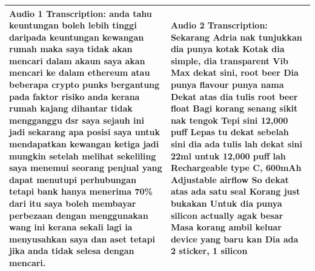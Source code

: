 \documentclass[preprint]{article}
\begin{document}
\begin{table}[hbt!]
\begin{tabular}{p{6.5cm} p{6.5cm}}
    Audio 1 Transcription: anda tahu keuntungan boleh lebih tinggi daripada keuntungan kewangan rumah maka saya tidak akan mencari dalam akaun saya akan mencari ke dalam ethereum atau beberapa crypto punks bergantung pada faktor risiko anda kerana rumah kajang dihantar tidak mengganggu dsr saya sejauh ini jadi sekarang apa posisi saya untuk mendapatkan kewangan ketiga jadi mungkin setelah melihat sekeliling saya menemui seorang penjual yang dapat menutupi perhubungan tetapi bank hanya menerima 70\% dari itu saya boleh membayar perbezaan dengan menggunakan wang ini kerana sekali lagi ia menyusahkan saya dan aset tetapi jika anda tidak selesa dengan mencari. & Audio 2 Transcription: Sekarang Adria nak tunjukkan dia punya kotak Kotak dia simple, dia transparent Vib Max dekat sini, root beer Dia punya flavour punya nama Dekat atas dia tulis root beer float Bagi korang senang sikit nak tengok Tepi sini 12,000 puff Lepas tu dekat sebelah sini dia ada tulis lah dekat sini 22ml untuk 12,000 puff lah Rechargeable type C, 600mAh Adjustable airflow So dekat atas ada satu seal Korang just bukakan Untuk dia punya silicon actually agak besar Masa korang ambil keluar device yang baru kan Dia ada 2 sticker, 1 silicon                                                                                                                                                                                                                                                                                                                                                                                                                                              \\
    \hline

\end{tabular}
\end{table}
\end{document}
